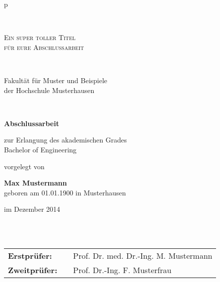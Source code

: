 \begin{titlepage}
	\begin{center}
		\begin{tabular}{p{\textwidth}}
			
			
			
			
			\\
			
			\begin{center}
				\LARGE{\textsc{
						Ein super toller Titel \\
						für eure Abschlussarbeit\\
				}}
			\end{center}
			
			\\
			
			
			\begin{center}
				\large{Fakultät für Muster und Beispiele \\
					der Hochschule Musterhausen \\}
			\end{center}
			
			\\
			
			\begin{center}
				\textbf{\Large{Abschlussarbeit}}
			\end{center}
			
			
			\begin{center}
				zur Erlangung des akademischen Grades\\
				Bachelor of Engineering
			\end{center}
			
			
			\begin{center}
				vorgelegt von
			\end{center}
			
			\begin{center}
				\large{\textbf{Max Mustermann}} \\
				\small{geboren am 01.01.1900 in Musterhausen}
			\end{center}
			
			\begin{center}
				\large{im Dezember 2014}
			\end{center}
			
			\\
			
			\\
			
			\begin{center}
				\begin{tabular}{lll}
					\textbf{Erstprüfer:} & & Prof. Dr. med. Dr.-Ing. M. Mustermann\\
					\textbf{Zweitprüfer:} & &Prof. Dr.-Ing. F. Musterfrau\\
				\end{tabular}
			\end{center}
			
		\end{tabular}
	\end{center}
\end{titlepage}
